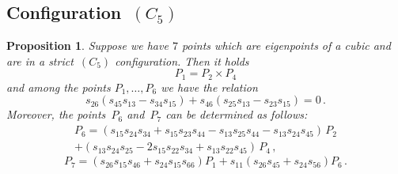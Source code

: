 \documentclass[a4paper, 11pt, reqno]{amsart}
\theoremstyle{plain}
\newtheorem{prop}[lemma]{Proposition}
\theoremstyle{definition}
\begin{document}
\subsection*{Configuration~\texorpdfstring{$(C_5)$}{C5}} 
\begin{prop}
\label{proposition:condition_5}
Suppose we have $7$ points which are eigenpoints of a cubic and are in a strict~$(C_5)$ configuration.
Then it holds
%
\[
  P_1 = P_2 \times P_4 
\]
%
and among the points $P_1, \dots, P_6$ we have the relation
%
\begin{equation}
\label{eq:condition_C5}
  s_{26}(s_{45}s_{13}-s_{34}s_{15})+s_{46}(s_{25}s_{13}-s_{23}s_{15}) = 0 \,.
\end{equation}
%
Moreover, the points~$P_6$ and~$P_7$ can be determined as follows:
%
\begin{equation}
\label{eq:p6formula}
\begin{multlined}
  P_6 = (s_{15}s_{24}s_{34}+s_{15}s_{23}s_{44} -s_{13}s_{25}s_{44} -s_{13}s_{24}s_{45}) \, P_2 \\ + (s_{13}s_{24}s_{25}-2s_{15}s_{22}s_{34}+s_{13}s_{22}s_{45}) \, P_4 \,, 
\end{multlined}
\end{equation}
%
\begin{equation}
\label{eq:p7formula}
P_7 = (s_{26}s_{15}s_{46}+s_{24}s_{15}s_{66})P_1 + s_{11}(s_{26}s_{45}+s_{24}s_{56})P_6\,.
\end{equation}
%
\end{prop}
\end{document}
